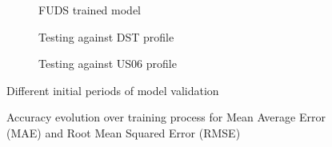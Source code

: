     \begin{figure}[htbp]
        \centering
        \begin{subfigure}[b]{0.325\textwidth}
            \centering
            
            \caption{FUDS trained model}
            \label{subfig:FUDS_diff_prof_compare}
        \end{subfigure}
        \hfill
        \begin{subfigure}[b]{0.325\textwidth}
            \centering
            
            \caption{Testing against DST profile}
            \label{subfig:DST_diff_prof_compare}
        \end{subfigure}
        \hfill
        \begin{subfigure}[b]{0.325\textwidth}
            \centering
            
            \caption{Testing against US06 profile}
            \label{subfig:US_diff_prof_compare}
        \end{subfigure}
        \caption{Different initial periods of model validation}
        \label{fig:diff_prof_compare}
    \end{figure}
    \begin{figure}
        \centering
        
        \caption{Accuracy evolution over training process for Mean Average Error (MAE) and Root Mean Squared Error (RMSE)}
        \label{fig:res_performance}
    \end{figure}

